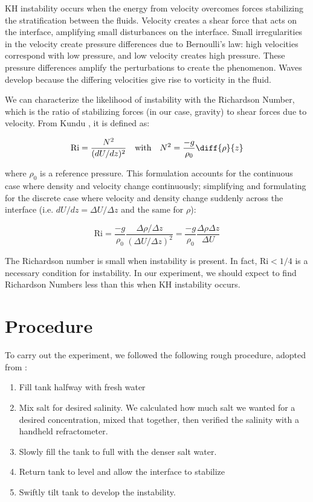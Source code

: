 \documentclass{article}
\begin{document}
KH instability occurs when the energy from velocity overcomes forces stabilizing
the stratification between the fluids. Velocity creates a shear force that acts
on the interface, amplifying small disturbances on the interface. Small
irregularities in the velocity create pressure differences due to Bernoulli's
law: high velocities correspond with low pressure, and low velocity creates high
pressure. These pressure differences amplify the perturbations to create the
phenomenon. Waves develop because the differing velocities give rise to
vorticity in the fluid.

We can characterize the likelihood of instability with the Richardson Number,
which is the ratio of stabilizing forces (in our case, gravity) to shear forces
due to velocity. From Kundu \cite{kundu}, it is defined as:

\[ \text{Ri} = \frac{N^2}{(dU/dz)^2} \quad\text{with}\quad N^2 = \frac{-g}{\rho_0} \diff{\rho}{z} \]

where \(\rho_0\) is a reference pressure. This formulation accounts for the
continuous case where density and velocity change continuously; simplifying and
formulating for the discrete case where velocity and density change suddenly
across the interface (i.e. \(dU/dz = \Delta U / \Delta z\) and the same for
\(\rho\)):

\[ \text{Ri} = \frac{-g}{\rho_0} \frac{\Delta \rho / \Delta z}{(\Delta U / \Delta z)^2} = \frac{-g}{\rho_0} \frac{\Delta \rho \Delta z}{\Delta U}\]

The Richardson number is small when instability is present. In fact, \(\text{Ri}
< 1/4\) is a necessary condition for instability. In our experiment, we should
expect to find Richardson Numbers less than this when KH instability occurs.

\section{Procedure}

To carry out the experiment, we followed the following rough procedure, adopted
from \cite{kh-instability-demo}:

\begin{enumerate}
    \item Fill tank halfway with fresh water
    \item Mix salt for desired salinity. We calculated how much salt we wanted
    for a desired concentration, mixed that together, then verified the salinity
    with a handheld refractometer.
    \item Slowly fill the tank to full with the denser salt water.
    \item Return tank to level and allow the interface to stabilize
    \item Swiftly tilt tank to develop the instability.
\end{enumerate}
\end{document}
